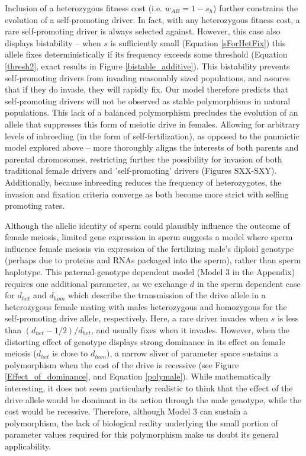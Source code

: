 \documentclass[12pt,letterpaper]{article}
\newcommand{\gc}[1]{{ \color{red} #1}}
\begin{document}
Inclusion of a heterozygous fitness cost (i.e. $w_{AB}=1-s_h$)
	further constrains the evolution of a self-promoting driver. 
In fact, with any heterozygous fitness cost, a rare self-promoting
	driver is always selected against. 
However, this case also displays bistability -- 
	when $s$ is sufficiently small (Equation \ref{sForHetFix}) this allele fixes deterministically if its 
	frequency exceeds some threshold  (Equation \ref{thresh2}, exact results in 
	Figure \ref{bistable_additive}).
This bistability prevents self-promoting drivers from invading 	
	reasonably sized populations, and assures that if they do invade, they will rapidly fix.
Our model therefore predicts that self-promoting drivers will not be
	observed as stable polymorphisms in natural populations. 
This lack of a balanced polymorphism %
	precludes the evolution of an
	allele that suppresses this form of meiotic drive in females. 
\gc{Allowing for arbitrary levels of inbreeding (in the form of
  self-fertilization), as opposed to the panmictic model explored
  above -- more thoroughly aligns the interests of both parents and
  parental chromosomes, restricting further the possibility for
  invasion of both traditional female drivers and 'self-promoting'
  drivers (Figures SXX-SXY). Additionally, because inbreeding reduces
  the frequency of heterozygotes, the invasion and fixation criteria
  converge as both become more strict with selfing promoting rates.} \newline 

Although the allelic identity of sperm could plausibly influence the outcome of female meiosis, 
	limited gene expression in sperm \citep[e.g.][]{Joseph2004}
	suggests a model where sperm influence female meiosis via expression of the fertilizing male's
	diploid genotype (perhaps due to proteins and RNAs packaged into the sperm), rather than sperm haplotype.
This paternal-genotype dependent model (Model 3 in the Appendix) requires one additional parameter, as we exchange $d$ in the sperm dependent case for $d_{het}$ and $d_{hom}$ which describe the transmission of the drive allele in a heterozygous female mating with males heterozygous and homozygous for the self-promoting drive allele, respectively.  
Here, a rare driver invades when $s$ is less than $(d_{het}-1/2)/d_{het}$, and usually fixes when it invades.
However, when the distorting effect of genotype displays strong dominance in its
	effect on female meiosis ($d_{het}$ is close to $d_{hom}$), 
	a narrow sliver of parameter space sustains a polymorphism
	when the cost of the drive is recessive
	(see Figure \ref{Effect_of_dominance}, and Equation \ref{polymale}).  
While mathematically interesting, it does not seem particularly realistic to think that the
	effect of the drive allele would be dominant in its action through the
	male genotype, while the cost would be recessive. 
Therefore, although Model 3 can sustain a polymorphism, 
	the lack of biological reality underlying the small portion of parameter values 
	required for this polymorphism make us doubt its general applicability. \newline 
\end{document}
